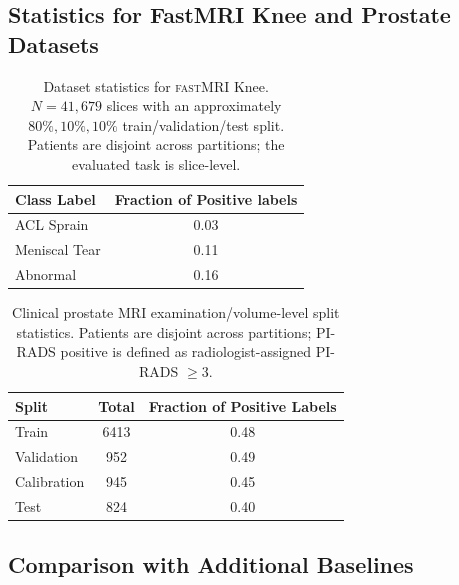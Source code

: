 \subsection{ Statistics for FastMRI Knee and Prostate Datasets}
\begin{table}[h]
\centering
\caption{Dataset statistics for \textsc{fastMRI} Knee. $N = 41,679$ slices with an approximately $80\%, 10\%, 10\%$ train/validation/test split. Patients are disjoint across partitions; the evaluated task is slice-level.}
\label{tab:fastmri_class_stats}
{%
\begin{tabular}{l|c}
\toprule
\textbf{Class Label} & \textbf{Fraction of Positive labels}  \\
\midrule
ACL Sprain      &  0.03  \\
Meniscal Tear &  0.11 \\
Abnormal        &  0.16  \\ %
\bottomrule
\end{tabular}
}
\end{table}


\begin{table}[h]

\centering
\caption{Clinical prostate MRI examination/volume-level split statistics. Patients are disjoint across partitions; PI-RADS positive is defined as radiologist-assigned PI-RADS $\geq 3$.}
\label{tab:prostate_dataset_stats}
{
\begin{tabular}{lcc}
\toprule
\textbf{Split} & \textbf{Total} & \textbf{Fraction of Positive Labels} \\
\midrule
Train       & 6413 & 0.48 \\
Validation  & 952  & 0.49 \\
Calibration   & 945  & 0.45 \\
Test          & 824  & 0.40 \\
\bottomrule
\end{tabular}
}
\end{table}



\subsection{Comparison with Additional Baselines}
\label{app:baselines}


